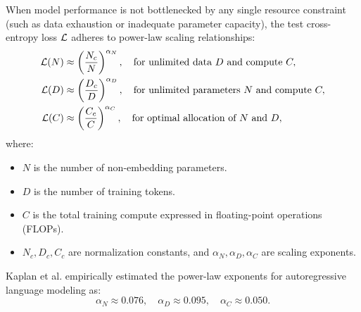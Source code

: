 \documentclass[../../main.tex]{subfiles}
\begin{document}
When model performance is not bottlenecked by any single resource constraint (such as data exhaustion or inadequate parameter capacity), the test cross-entropy loss $\mathcal{L}$ adheres to power-law scaling relationships:
\begin{align}
\label{eq:kaplan_param_scaling}
\mathcal{L}(N) &\approx \left( \frac{N_c}{N} \right)^{\alpha_N}, \quad \text{for unlimited data } D \text{ and compute } C, \\
\label{eq:kaplan_data_scaling}
\mathcal{L}(D) &\approx \left( \frac{D_c}{D} \right)^{\alpha_D}, \quad \text{for unlimited parameters } N \text{ and compute } C, \\
\label{eq:kaplan_compute_scaling}
\mathcal{L}(C) &\approx \left( \frac{C_c}{C} \right)^{\alpha_C}, \quad \text{for optimal allocation of } N \text{ and } D,
\end{align}
where:
\begin{itemize}
    \item $N$ is the number of non-embedding parameters.
    \item $D$ is the number of training tokens.
    \item $C$ is the total training compute expressed in floating-point operations (FLOPs).
    \item $N_c, D_c, C_c$ are normalization constants, and $\alpha_N, \alpha_D, \alpha_C$ are scaling exponents.
\end{itemize}
Kaplan et al. empirically estimated the power-law exponents for autoregressive language modeling as:
\begin{equation}
\alpha_N \approx 0.076, \quad \alpha_D \approx 0.095, \quad \alpha_C \approx 0.050.
\end{equation}
\end{document}
